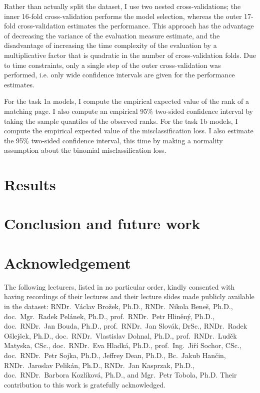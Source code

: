 Rather than actually split the dataset, I use two nested cross-validations; the
inner 16-fold cross-validation performs the model selection, whereas the outer
17-fold cross-validation estimates the performance. This approach has the
advantage of decreasing the variance of the evaluation measure estimate,
and the disadvantage of increasing the time complexity of the evaluation by a
multiplicative factor that is quadratic in the number of cross-validation
folds. Due to time constraints, only a single step of the outer
cross-validation was performed, i.e. only wide confidence intervals are
given for the performance estimates.

For the task 1a models, I compute the empirical expected value of the rank of a
matching page. I also compute an empirical 95\% two-sided confidence interval
by taking the sample quantiles of the observed ranks.
For the task 1b models, I compute the empirical expected value of the
misclassification loss. I also estimate the 95\% two-sided confidence interval,
this time by making a normality assumption about the binomial misclassification
loss.

\section{Results}
\label{sec:results}

\section{Conclusion and future work}
\label{sec:conclusion}

\section*{Acknowledgement}
The following lecturers, listed in no particular order, kindly consented with
having recordings of their lectures and their lecture slides made publicly
available in the dataset:
RNDr.\ Václav Brožek, Ph.D.,
RNDr.\ Nikola Beneš, Ph.D.,
doc.\ Mgr.\ Radek Pelánek, Ph.D.,
prof.\ RNDr.\ Petr Hliněný, Ph.D.,
doc.\ RNDr.\ Jan Bouda, Ph.D.,
prof.\ RNDr.\ Jan Slovák, DrSc.,
RNDr.\ Radek Ošlejšek, Ph.D.,
doc.\ RNDr.\ Vlastislav Dohnal, Ph.D.,
prof.\ RNDr.\ Luděk Matyska, CSc.,
doc.\ RNDr.\ Eva Hladká, Ph.D.,
prof.\ Ing.\ Jiří Sochor, CSc.,
doc.\ RNDr.\ Petr Sojka, Ph.D.,
Jeffrey Dean, Ph.D.,
Bc.\ Jakub Hančin,
RNDr.\ Jaroslav Pelikán, Ph.D.,
RNDr.\ Jan Kasprzak, Ph.D.,
doc.\ RNDr.\ Barbora Kozlíková, Ph.D., and
Mgr.\ Petr Tobola, Ph.D.
Their contribution to this work is gratefully acknowledged.


